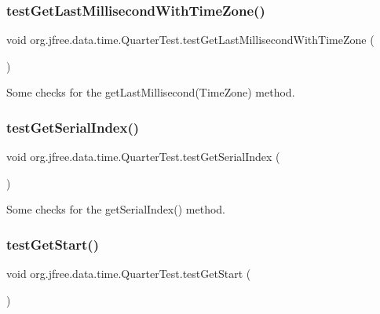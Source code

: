 \subsubsection{\texorpdfstring{test\+Get\+Last\+Millisecond\+With\+Time\+Zone()}{testGetLastMillisecondWithTimeZone()}}
{\footnotesize\ttfamily void org.\+jfree.\+data.\+time.\+Quarter\+Test.\+test\+Get\+Last\+Millisecond\+With\+Time\+Zone (\begin{DoxyParamCaption}{ }\end{DoxyParamCaption})}

Some checks for the get\+Last\+Millisecond(\+Time\+Zone) method. \mbox{\label{classorg_1_1jfree_1_1data_1_1time_1_1_quarter_test_affcb204c464b215e3b3ff1bcc03424d0}} 
\subsubsection{\texorpdfstring{test\+Get\+Serial\+Index()}{testGetSerialIndex()}}
{\footnotesize\ttfamily void org.\+jfree.\+data.\+time.\+Quarter\+Test.\+test\+Get\+Serial\+Index (\begin{DoxyParamCaption}{ }\end{DoxyParamCaption})}

Some checks for the get\+Serial\+Index() method. \mbox{\label{classorg_1_1jfree_1_1data_1_1time_1_1_quarter_test_a5575b7618862c2c3299ac9577ec1632d}} 
\subsubsection{\texorpdfstring{test\+Get\+Start()}{testGetStart()}}
{\footnotesize\ttfamily void org.\+jfree.\+data.\+time.\+Quarter\+Test.\+test\+Get\+Start (\begin{DoxyParamCaption}{ }\end{DoxyParamCaption})}

